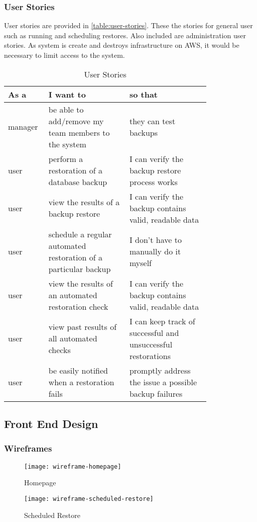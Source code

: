 	\subsubsection{User Stories}
		User stories are provided in \autoref{table:user-stories}. These the stories for general user such as running and scheduling restores. Also included are administration user stories. As system is create and destroys infrastructure on AWS, it would be necessary to limit access to the system.
		
		\begin{table}[H]
			\setlength{\belowcaptionskip}{15pt plus 3pt minus 2pt}
			\caption{User Stories}
			\begin{tabular}{|l|p{0.4\linewidth}|p{0.4\linewidth}|} \hline
				\textbf{As a} & \textbf{I want to} & \textbf{so that} \\ \hline
				manager & be able to add/remove my team members to the system & they can test backups \\ \hline
				user & perform a restoration of a database backup & I can verify the backup restore process works \\ \hline
				user & view the results of a backup restore & I can verify the backup contains valid, readable data \\ \hline
				user & schedule a regular automated restoration of a particular backup & I don't have to manually do it myself \\ \hline
				user & view the results of an automated restoration check & I can verify the backup contains valid, readable data \\ \hline
				user & view past results of all automated checks & I can keep track of successful and unsuccessful restorations \\ \hline
				user & be easily notified when a restoration fails & promptly address the issue a possible backup failures \\  \hline
			\end{tabular}
			\label{table:user-stories}
		\end{table}
		
	\subsection{Front End Design}
	\subsubsection{Wireframes}
		\begin{figure}[H]
			\setlength{\belowcaptionskip}{15pt plus 3pt minus 2pt}
			\caption{Homepage}
			\centering
			\texttt{[image: wireframe-homepage]}
			\label{fig:homepage}
		\end{figure}
		
		\begin{figure}[H]
			\setlength{\belowcaptionskip}{15pt plus 3pt minus 2pt}
			\caption{Scheduled Restore}
			\centering
			\texttt{[image: wireframe-scheduled-restore]}
			\label{fig:scheduled}
		\end{figure}
	
	